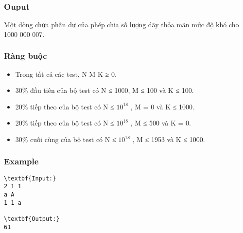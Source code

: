 \subsubsection{Ouput}

Một dòng chứa phần dư của phép chia số lượng dãy thỏa mãn mức độ khó cho 1000 000 007.

\subsubsection{Ràng buộc}
\begin{itemize}
	\item Trong tất cả các test, N M K ≥ 0.
	\item 30\% đầu tiên của bộ test có N ≤ 1000, M ≤ 100 và K ≤ 100.
	\item 20\% tiếp theo của bộ test có N ≤ $10^{18}$ , M = 0 và K ≤ 1000.
	\item 20\% tiếp theo của bộ test có N ≤ $10^{18}$ , M ≤ 500 và K = 0.
	\item 30\% cuối cùng của bộ test có N ≤ $10^{18}$ , M ≤ 1953 và K ≤ 1000.
\end{itemize}

\subsubsection{Example}
\begin{verbatim}
\textbf{Input:}
2 1 1
a A
1 1 a

\textbf{Output:}
61
\end{verbatim}
